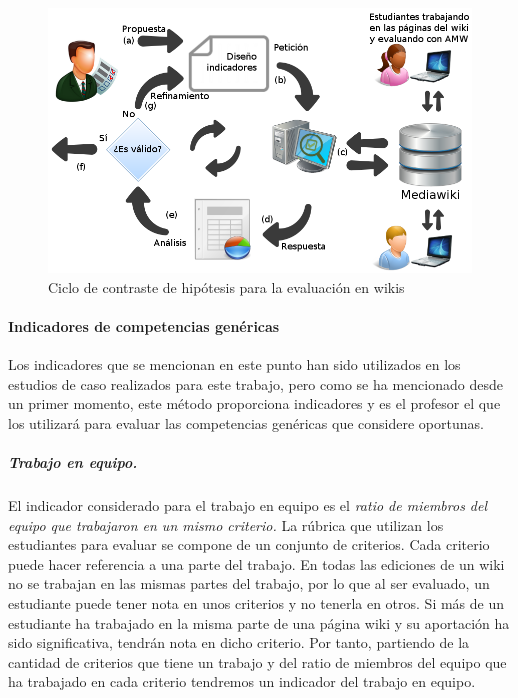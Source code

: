 \begin{figure}
  \begin{center}
    \includegraphics[scale=0.45]{AmwDiagram2.png}
  \end{center}
  \caption{Ciclo de contraste de hipótesis para la evaluación en wikis}
  \label{fig:AmwDiagram2}
\end{figure}

			\paragraph*{Indicadores de competencias genéricas}

				Los indicadores que se mencionan en este punto han sido utilizados en los estudios de caso realizados para este trabajo, pero como se ha mencionado desde un primer momento, este método proporciona indicadores y es el profesor el que los utilizará para evaluar las competencias genéricas que considere oportunas.

			\subparagraph*{Trabajo en equipo.}
			El indicador considerado para el trabajo en equipo es el \emph{ratio de miembros del equipo que trabajaron en un mismo criterio.} La rúbrica que utilizan los estudiantes para evaluar se compone de un conjunto de criterios. Cada criterio puede hacer referencia a una parte del trabajo. En todas las ediciones de un wiki no se trabajan en las mismas partes del trabajo, por lo que al ser evaluado, un estudiante puede tener nota en unos criterios y no tenerla en otros. Si más de un estudiante ha trabajado en la misma parte de una página wiki y su aportación ha sido significativa, tendrán nota en dicho criterio. Por tanto, partiendo de la cantidad de criterios que tiene un trabajo y del ratio de miembros del equipo que ha trabajado en cada criterio tendremos un indicador del trabajo en equipo.

